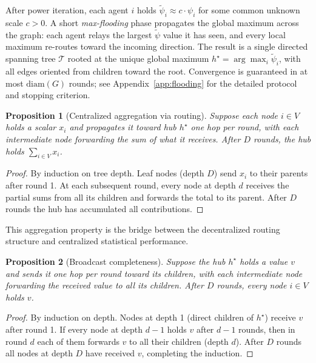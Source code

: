 \documentclass{article}
\newtheorem{proposition}{Proposition}
\begin{document}
After power iteration, each agent $i$ holds $\tilde{\psi}_i \approx c \cdot \psi_i$ for some common unknown scale $c > 0$. A short \emph{max-flooding} phase propagates the global maximum across the graph: each agent relays the largest $\tilde{\psi}$ value it has seen, and every local maximum re-routes toward the incoming direction. The result is a single directed spanning tree $\mathcal{T}$ rooted at the unique global maximum $h^\star = \arg\max_i \tilde{\psi}_i$, with all edges oriented from children toward the root. Convergence is guaranteed in at most $\mathrm{diam}(G)$ rounds; see Appendix~\ref{app:flooding} for the detailed protocol and stopping criterion.

\begin{proposition}[Centralized aggregation via routing]
\label{prop:aggregation}
Suppose each node $i \in V$ holds a scalar $x_i$ and propagates it toward hub $h^\star$ one hop per round, with each intermediate node forwarding the sum of what it receives. After $D$ rounds, the hub holds $\sum_{i \in V} x_i$.
\end{proposition}

\begin{proof}
By induction on tree depth. Leaf nodes (depth $D$) send $x_i$ to their parents after round 1. At each subsequent round, every node at depth $d$ receives the partial sums from all its children and forwards the total to its parent. After $D$ rounds the hub has accumulated all contributions.
\end{proof}

This aggregation property is the bridge between the decentralized routing structure and centralized statistical performance.

\begin{proposition}[Broadcast completeness]
\label{prop:broadcast}
Suppose the hub $h^\star$ holds a value $v$ and sends it one hop per round toward its children, with each intermediate node forwarding the received value to all its children. After $D$ rounds, every node $i \in V$ holds $v$.
\end{proposition}

\begin{proof}
By induction on depth. Nodes at depth 1 (direct children of $h^\star$) receive $v$ after round 1. If every node at depth $d-1$ holds $v$ after $d-1$ rounds, then in round $d$ each of them forwards $v$ to all their children (depth $d$). After $D$ rounds all nodes at depth $D$ have received $v$, completing the induction.
\end{proof}
\end{document}
